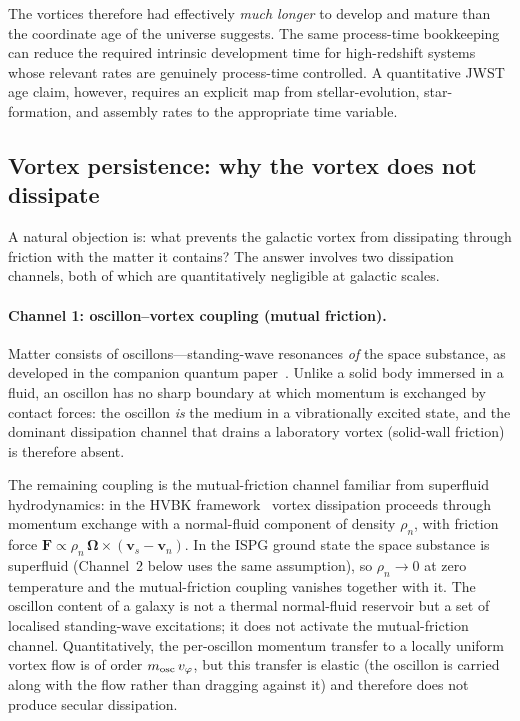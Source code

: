 \documentclass[11pt]{article}
\begin{document}
The vortices therefore had effectively \emph{much longer} to develop
and mature than the coordinate age of the universe suggests.
The same process-time bookkeeping can reduce the required intrinsic
development time for high-redshift systems whose relevant rates are
genuinely process-time controlled.  A quantitative JWST age claim,
however, requires an explicit map from stellar-evolution, star-formation,
and assembly rates to the appropriate time variable.

\subsection{Vortex persistence: why the vortex does not dissipate}\label{sec:vortex_persistence}

A natural objection is: what prevents the galactic vortex from
dissipating through friction with the matter it contains?
The answer involves two dissipation channels, both of which are
quantitatively negligible at galactic scales.

\paragraph{Channel 1: oscillon--vortex coupling (mutual friction).}
Matter consists of oscillons---standing-wave resonances \emph{of}
the space substance, as developed in the companion quantum
paper~\cite{Lotishvili2026Q}.
Unlike a solid body immersed in a fluid, an oscillon has no sharp
boundary at which momentum is exchanged by contact forces: the
oscillon \emph{is} the medium in a vibrationally excited state,
and the dominant dissipation channel that drains a laboratory
vortex (solid-wall friction) is therefore absent.

The remaining coupling is the mutual-friction channel familiar from
superfluid hydrodynamics: in the HVBK
framework~\cite{Volovik2003,PethickSmith2008} vortex dissipation
proceeds through momentum exchange with a normal-fluid component of
density $\rho_n$, with friction force
$\mathbf{F}\propto\rho_n\,\boldsymbol{\Omega}\times
(\mathbf{v}_s-\mathbf{v}_n)$.  In the ISPG ground state the space
substance is superfluid (Channel~2 below uses the same assumption),
so $\rho_n\to 0$ at zero temperature and the mutual-friction
coupling vanishes together with it.  The oscillon content of a galaxy
is not a thermal normal-fluid reservoir but a set of localised
standing-wave excitations; it does not activate the mutual-friction
channel.  Quantitatively, the per-oscillon momentum transfer to a
locally uniform vortex flow is of order $m_{\rm osc}\,v_\phi$, but
this transfer is elastic (the oscillon is carried along with the
flow rather than dragging against it) and therefore does not produce
secular dissipation.
\end{document}
